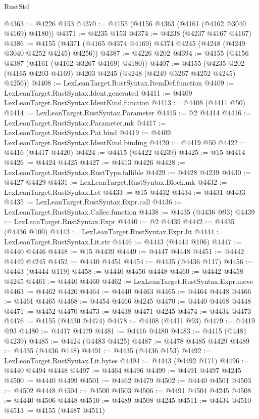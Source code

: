 \begin{lexlean}{RustStd}
\begin{coremodule}
@4363 := @4226 @153
@4370 := @4155 (@4156 @4363 (@4161 (@4162 @3040 @4169) @4180))
@4371 := @4235 @153
@4374 := @4238 (@4237 @4167 @4167)
@4386 := @4155 (@4371 (@4165 @4374 @4169) @4374 @4245 (@4248 (@4249 @3040 @4252 @4245) @4256))
@4387 := @4226 @202
@4394 := @4155 (@4156 @4387 (@4161 (@4162 @3267 @4169) @4180))
@4407 := @4155 (@4235 @202 (@4165 @4203 @4169) @4203 @4245 (@4248 (@4249 @3267 @4252 @4245) @4256))
@4408 := LexLeanTarget.RustSyntax.ItemDef.function
@4409 := LexLeanTarget.RustSyntax.Ident.generated
@4411 := @4409 LexLeanTarget.RustSyntax.IdentKind.function
@4413 := @4408 (@4411 @50)
@4414 := LexLeanTarget.RustSyntax.Parameter
@4415 := @2 @4414
@4416 := LexLeanTarget.RustSyntax.Parameter.mk
@4417 := LexLeanTarget.RustSyntax.Pat.bind
@4419 := @4409 LexLeanTarget.RustSyntax.IdentKind.binding
@4420 := @4419 @50
@4422 := @4416 (@4417 @4420)
@4424 := @4415 (@4422 @4239)
@4425 := @15 @4414
@4426 := @4424 @4425
@4427 := @4413 @4426
@4428 := LexLeanTarget.RustSyntax.RustType.fallible
@4429 := @4428 @4239
@4430 := @4427 @4429
@4431 := LexLeanTarget.RustSyntax.Block.mk
@4432 := LexLeanTarget.RustSyntax.Let
@4433 := @15 @4432
@4434 := @4431 @4433
@4435 := LexLeanTarget.RustSyntax.Expr.call
@4436 := LexLeanTarget.RustSyntax.Callee.function
@4438 := @4435 (@4436 @93)
@4439 := LexLeanTarget.RustSyntax.Expr
@4440 := @2 @4439
@4442 := @4435 (@4436 @100)
@4443 := LexLeanTarget.RustSyntax.Expr.lit
@4444 := LexLeanTarget.RustSyntax.Lit.str
@4446 := @4443 (@4444 @106)
@4447 := @4440 @4446
@4448 := @15 @4439
@4449 := @4447 @4448
@4451 := @4442 @4449 @4245
@4452 := @4440 @4451
@4454 := @4435 (@4436 @117)
@4456 := @4443 (@4444 @119)
@4458 := @4440 @4456 @4448
@4460 := @4442 @4458 @4245
@4461 := @4440 @4460
@4462 := LexLeanTarget.RustSyntax.Expr.move
@4463 := @4462 @4420
@4464 := @4440 @4463
@4465 := @4464 @4448
@4466 := @4461 @4465
@4468 := @4454 @4466 @4245
@4470 := @4440 @4468 @4448
@4471 := @4452 @4470
@4473 := @4438 @4471 @4245
@4474 := @4434 @4473
@4476 := @4155 (@4430 @4474)
@4478 := @4408 (@4411 @93)
@4479 := @4419 @93
@4480 := @4417 @4479
@4481 := @4416 @4480
@4483 := @4415 (@4481 @4239)
@4485 := @4424 (@4483 @4425)
@4487 := @4478 @4485 @4429
@4489 := @4435 (@4436 @148)
@4491 := @4435 (@4436 @153)
@4492 := LexLeanTarget.RustSyntax.Lit.bytes
@4494 := @4443 (@4492 @171)
@4496 := @4440 @4494 @4448
@4497 := @4464 @4496
@4499 := @4491 @4497 @4245
@4500 := @4440 @4499
@4501 := @4462 @4479
@4502 := @4440 @4501
@4503 := @4502 @4448
@4504 := @4500 @4503
@4506 := @4491 @4504 @4245
@4508 := @4440 @4506 @4448
@4510 := @4489 @4508 @4245
@4511 := @4434 @4510
@4513 := @4155 (@4487 @4511)

\end{coremodule}
\end{lexlean}
